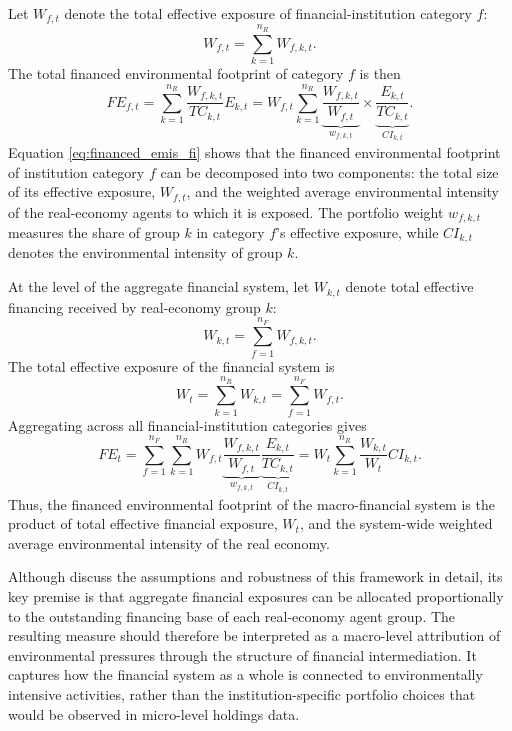 Let $W_{f,t}$ denote the total effective exposure of financial-institution category $f$:
\begin{equation}
W_{f,t} = \sum_{k=1}^{n_R} W_{f,k,t}.
\end{equation}
The total financed environmental footprint of category $f$ is then
\begin{equation}
FE_{f,t}
= \sum_{k=1}^{n_R} \frac{W_{f,k,t}}{TC_{k,t}} E_{k,t}
= W_{f,t} \sum_{k=1}^{n_R}
\underbrace{\frac{W_{f,k,t}}{W_{f,t}}}_{w_{f,k,t}}
\times
\underbrace{\frac{E_{k,t}}{TC_{k,t}}}_{CI_{k,t}}.
\label{eq:financed_emis_fi}
\end{equation}
Equation \ref{eq:financed_emis_fi} shows that the financed environmental footprint of institution category $f$ can be decomposed into two components: the total size of its effective exposure, $W_{f,t}$, and the weighted average environmental intensity of the real-economy agents to which it is exposed. The portfolio weight $w_{f,k,t}$ measures the share of group $k$ in category $f$'s effective exposure, while $CI_{k,t}$ denotes the environmental intensity of group $k$.

At the level of the aggregate financial system, let $W_{k,t}$ denote total effective financing received by real-economy group $k$:
\begin{equation}
W_{k,t} = \sum_{f=1}^{n_F} W_{f,k,t}.
\end{equation}
The total effective exposure of the financial system is
\begin{equation}
W_t = \sum_{k=1}^{n_R} W_{k,t}
= \sum_{f=1}^{n_F} W_{f,t}.
\end{equation}
Aggregating across all financial-institution categories gives
\begin{equation}
FE_t
= \sum_{f=1}^{n_F} \sum_{k=1}^{n_R}
W_{f,t}
\underbrace{\frac{W_{f,k,t}}{W_{f,t}}}_{w_{f,k,t}}
\underbrace{\frac{E_{k,t}}{TC_{k,t}}}_{CI_{k,t}}
= W_t \sum_{k=1}^{n_R} \frac{W_{k,t}}{W_t} CI_{k,t}.
\end{equation}
Thus, the financed environmental footprint of the macro-financial system is the product of total effective financial exposure, $W_t$, and the system-wide weighted average environmental intensity of the real economy.

Although \textcite{jondeau_environmental_2026} discuss the assumptions and robustness of this framework in detail, its key premise is that aggregate financial exposures can be allocated proportionally to the outstanding financing base of each real-economy agent group. The resulting measure should therefore be interpreted as a macro-level attribution of environmental pressures through the structure of financial intermediation. It captures how the financial system as a whole is connected to environmentally intensive activities, rather than the institution-specific portfolio choices that would be observed in micro-level holdings data.